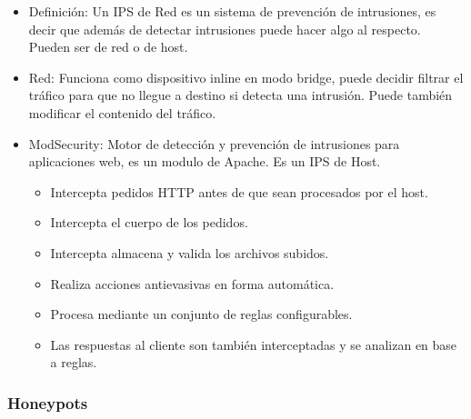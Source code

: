 \begin{itemize}
	\item Definición: Un IPS de Red es un sistema de prevención de intrusiones, es decir que además de detectar intrusiones
	puede hacer algo al respecto. Pueden ser de red o de host.
	\item Red: Funciona como dispositivo inline en modo bridge, puede decidir filtrar el tráfico para que no llegue a destino
	si detecta una intrusión. Puede también modificar el contenido del tráfico.
	\item ModSecurity: Motor de detección y prevención de intrusiones para aplicaciones web, es un modulo de Apache. Es un 
	IPS de Host.
	\begin{itemize}
		\item Intercepta pedidos HTTP antes de que sean procesados por el host.
		\item Intercepta el cuerpo de los pedidos.
		\item Intercepta almacena y valida los archivos subidos.
		\item Realiza acciones antievasivas en forma automática.
		\item Procesa mediante un conjunto de reglas configurables.
		\item Las respuestas al cliente son también interceptadas y se analizan en base a reglas.
	\end{itemize}
\end{itemize}

\subsubsection{Honeypots}

